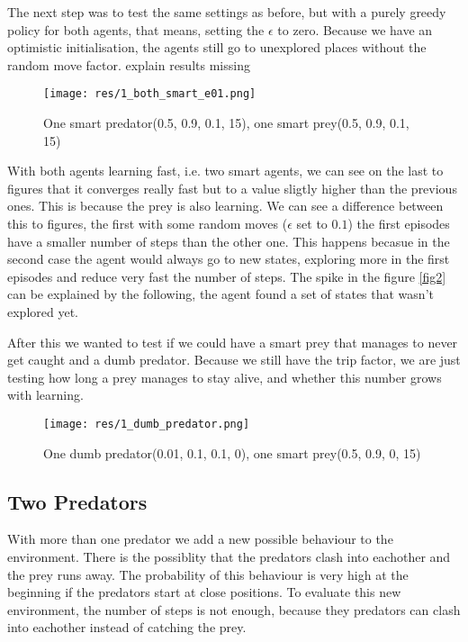 \documentclass{article}
\begin{document}
The next step was to test the same settings as before, but with a purely greedy
policy for both agents, that means, setting the $\epsilon$ to zero. Because we
have an optimistic initialisation, the agents still go to unexplored places
without the random move factor.
\error explain results missing

\begin{figure}[htbp]
    \centering
    \texttt{[image: res/1\_both\_smart\_e01.png]}
    \caption{One smart predator(0.5, 0.9, 0.1, 15), one smart prey(0.5, 0.9, 0.1, 15)}
\end{figure}

With both agents learning fast, i.e. two smart agents, we can see on the last to
figures that it converges really fast but to a value sligtly higher than the
previous ones. This is because the prey is also learning.
We can see a difference between this to figures, the first with some random
moves ($\epsilon$ set to $0.1$) the first episodes have a smaller number of
steps than the other one. This happens becasue in the second case the agent
would always go to new states, exploring more in the first episodes and reduce
very fast the number of steps.
The spike in the figure \ref{fig2} can be explained by the following, the agent
found a set of states that wasn't explored yet.

After this we wanted to test if we could have a smart prey that manages to never get caught and a dumb predator. Because we still have the trip
factor, we are just testing how long a prey manages to stay alive, and whether this
number grows with learning.

\begin{figure}[htbp]
    \centering
    \texttt{[image: res/1\_dumb\_predator.png]}
    \caption{One dumb predator(0.01, 0.1, 0.1, 0), one smart prey(0.5, 0.9, 0, 15)}
\end{figure}



\subsection{Two Predators}
\label{twoP}
With more than one predator we add a new possible behaviour to the environment. There is the possiblity that the predators clash into eachother and the prey runs away. The
probability of this behaviour is very high at the beginning if the
predators start at close positions. To evaluate this new environment, the number
of steps is not enough, because they predators can clash into eachother instead of catching the prey.
\end{document}
